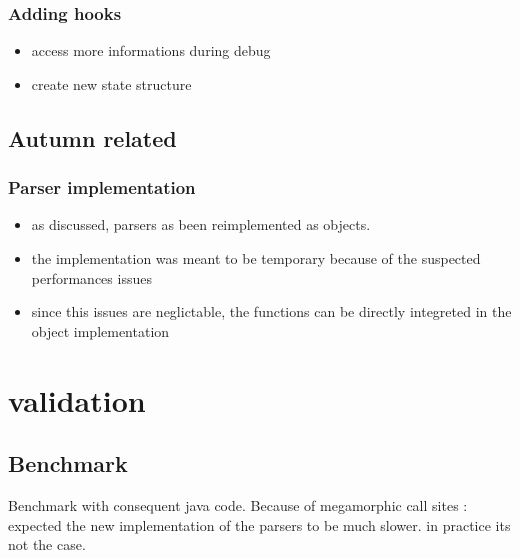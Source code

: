 	\subsection{Adding hooks}
	\begin{itemize}
		\item access more informations during debug
		\item create new state structure
	\end{itemize}

	\section{Autumn related}
		\subsection{Parser implementation}
		\begin{itemize}
			\item as discussed, parsers as been reimplemented as objects.
			\item the implementation was meant to be temporary because of the suspected performances issues
			\item since this issues are neglictable, the functions can be directly integreted in the object implementation
		\end{itemize}


%
\chapter{validation}
%

\section{Benchmark}
Benchmark with consequent java code. Because of megamorphic call sites : expected the new implementation of the parsers to be much slower. in practice its not the case.


